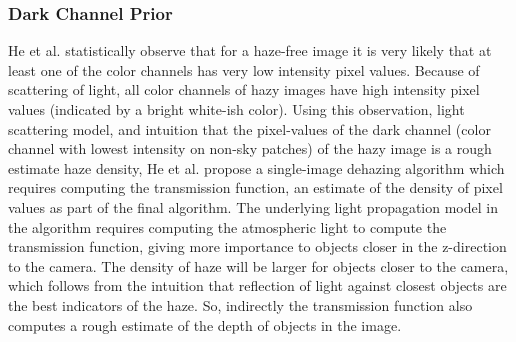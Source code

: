 \documentclass{article}
\begin{document}
\subsubsection{Dark Channel Prior}
He et al. \cite{dcp} statistically observe that for a haze-free image it is very likely that at least one of the color channels has very low intensity pixel values. Because of scattering of light, all color channels of hazy images have high intensity pixel values (indicated by a bright white-ish color). Using this observation, light scattering model, and intuition that the pixel-values of the dark channel (color channel with lowest intensity on non-sky patches) of the hazy image is a rough estimate haze density, He et al. propose a single-image dehazing algorithm which requires computing the transmission function, an estimate of the density of pixel values as part of the final algorithm. The underlying light propagation model in the algorithm requires computing the atmospheric light to compute the transmission function, giving more importance to objects closer in the z-direction to the camera. The density of haze will be larger for objects closer to the camera, which follows from the intuition that reflection of light against closest objects are the best indicators of the haze. So, indirectly the transmission function also computes a rough estimate of the depth of objects in the image.
\end{document}
